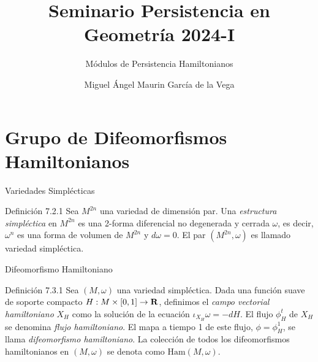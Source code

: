 \documentclass{beamer}
\title{Seminario Persistencia en Geometría 2024-I}
\subtitle{Módulos de Persistencia Hamiltonianos}
\author{Miguel Ángel Maurin García de la Vega}
\def\R\re
\def \R{{\bf R}}
\newcommand{\mrm}{\mathrm}
\newcommand{\Ham}{\mrm{Ham}}
\def \re{{\mathbb R}}
\begin{document}
\frenchspacing


  \frame{\maketitle}


    \section{Grupo de Difeomorfismos Hamiltonianos}


\begin{frame}{Variedades Simplécticas}
\begin{block}{Definición 7.2.1}
Sea $M^{2n}$ una variedad de dimensión par. Una \textit{estructura simpléctica} en $M^{2n}$ es una 2-forma diferencial no degenerada y cerrada $\omega$, \pause es decir, $\omega^n$ es una forma de volumen de $M^{2n}$ y $d\omega = 0$. El par $(M^{2n}, \omega)$ es llamado variedad simpléctica.

 \end{block}  

\end{frame}

    
\begin{frame}{Difeomorfismo Hamiltoniano}

\begin{block}{Definición 7.3.1}
Sea $(M, \omega)$ una variedad simpléctica. Dada una función suave de soporte compacto $H: M \times [0,1] \to \R$, definimos \pause el \textit{campo vectorial hamiltoniano} $X_H$ como la solución de la ecuación $\iota_{X_H} \omega = -dH$. \pause El flujo $\phi_H^t$ de $X_H$ se denomina \textit{flujo hamiltoniano}. \pause El mapa a tiempo 1 de este flujo, $\phi = \phi^1_H$, se llama \textit{difeomorfismo hamiltoniano}. \pause La colección de todos los difeomorfismos hamiltonianos en $(M, \omega)$ se denota como $\Ham(M, \omega)$.


 \end{block}
\end{frame}
\end{document}
